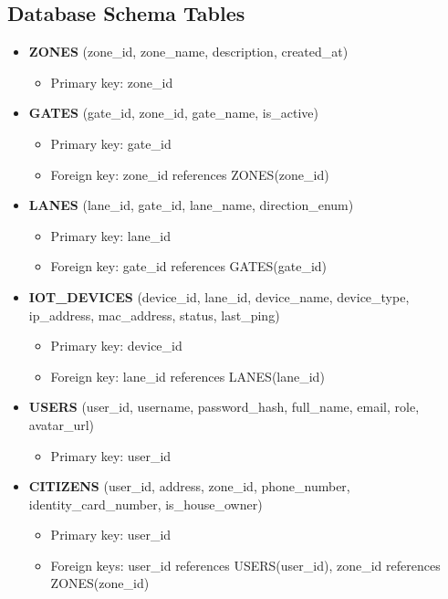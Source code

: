 \documentclass[a4paper]{article}
\begin{document}
\subsection{Database Schema Tables}
\begin{itemize}
    \item \textbf{ZONES} (zone\_id, zone\_name, description, created\_at)
    \begin{itemize}
        \item Primary key: zone\_id
    \end{itemize}

    \item \textbf{GATES} (gate\_id, zone\_id, gate\_name, is\_active)
    \begin{itemize}
        \item Primary key: gate\_id
        \item Foreign key: zone\_id references ZONES(zone\_id)
    \end{itemize}

    \item \textbf{LANES} (lane\_id, gate\_id, lane\_name, direction\_enum)
    \begin{itemize}
        \item Primary key: lane\_id
        \item Foreign key: gate\_id references GATES(gate\_id)
    \end{itemize}

    \item \textbf{IOT\_DEVICES} (device\_id, lane\_id, device\_name, device\_type, ip\_address, mac\_address, status, last\_ping)
    \begin{itemize}
        \item Primary key: device\_id
        \item Foreign key: lane\_id references LANES(lane\_id)
    \end{itemize}

    \item \textbf{USERS} (user\_id, username, password\_hash, full\_name, email, role, avatar\_url)
    \begin{itemize}
        \item Primary key: user\_id
    \end{itemize}

    \item \textbf{CITIZENS} (user\_id, address, zone\_id, phone\_number, identity\_card\_number, is\_house\_owner)
    \begin{itemize}
        \item Primary key: user\_id
        \item Foreign keys: user\_id references USERS(user\_id), zone\_id references ZONES(zone\_id)
    \end{itemize}


\end{itemize}
\end{document}
